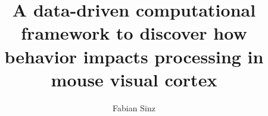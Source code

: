 \usepackage{xifthen}
\newcommand{\ifequals}[3]{\ifthenelse{\equal{#1}{#2}}{#3}{}}
\newcommand{\case}[2]{#1 #2} %
\newenvironment{switch}[1]{\renewcommand{\case}{\ifequals{#1}}}{}

\newcommand{\owptitle}[2]{
    \begin{switch}{#1}
        \case{1}{
            \begin{switch}{#2}
                \case{1}{A video-driven latent state model of the visual system}
                \case{2}{Functional twin with behavior}
            \end{switch}
        }
    \end{switch}
}


\newcommand{\oonetitle}{Develop a video-based, data-driven functional twin of mouse visual cortex and motor behavior in virtual replicas of real environments}
\newcommand{\ooneshort}{Develop a data-driven functional twin}

\newcommand{\otwotitle}{Find correspondences between changes in stimulus selectivity and behavioral context}
\newcommand{\otwoshort}{Changes in stimulus selectivity with behavioral context}

\newcommand{\othreetitle}{Predict how disabling selectivity-changes affects task-driven behavior}
\newcommand{\othreeshort}{Predict how disabling selectivity-changes affects task-driven behavior}



\author{Fabian Sinz}
\title{A data-driven computational framework to discover how behavior impacts  processing in mouse visual cortex}
